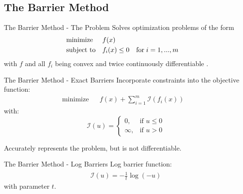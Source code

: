 \documentclass[]{beamer}
\begin{document}
  \subsection*{The Barrier Method}
  \begin{frame}{The Barrier Method - The Problem}
    Solves optimization problems of the form
    \begin{align*}
      &\textnormal{minimize} && f(x) && \\
      &\textnormal{subject to}  && f_i(x) \leq 0 \quad \textnormal{for} \; i=1,...,m &&
    \end{align*}
    with $f$ and all $f_i$ being convex and twice continuously differentiable \cite[561]{boyd}.
  \end{frame}
  \begin{frame}{The Barrier Method - Exact Barriers}
    Incorporate constraints into the objective function:
    \begin{align*}
      &\textrm{minimize} && f(x) + \sum_{i=1}^m \mathcal{I}(f_i(x))&&
    \end{align*}
    with:
    \begin{equation*}
      \mathcal{I}(u) = \begin{cases}
            0,      & \text{if }  u \leq 0\\
            \infty, & \text{if }  u > 0
            \end{cases}
    \end{equation*}
    
    Accurately represents the problem, but is not differentiable.
  \end{frame}
  \begin{frame}{The Barrier Method - Log Barriers}
    Log barrier function:
    \begin{align*}
      \hat{\mathcal{I}}(u)= -\frac{1}{t}\log(-u)
    \end{align*}
    with parameter $t$.

    \begin{center}
    \end{center}
  \end{frame}
\end{document}
